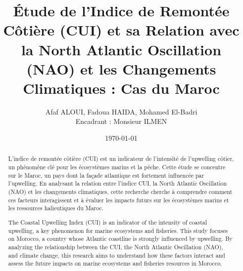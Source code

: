 \documentclass[a4paper,12pt]{article}
\title{Étude de l'Indice de Remontée Côtière (CUI) et sa Relation avec la North Atlantic Oscillation (NAO) et les Changements Climatiques : Cas du Maroc}
\author{Afaf ALOUI, Fadoua HAIDA, Mohamed El-Badri \\ Encadrant : Monsieur ILMEN}
\date{\today}
\begin{document}
\maketitle


\newpage
\vspace*{3cm}
\begin{abstract}
L'indice de remontée côtière (CUI) est un indicateur de l'intensité de l'upwelling côtier, un phénomène clé pour les écosystèmes marins et la pêche. Cette étude se concentre sur le Maroc, un pays dont la façade atlantique est fortement influencée par l'upwelling. En analysant la relation entre l'indice CUI, la North Atlantic Oscillation (NAO) et les changements climatiques, cette recherche cherche à comprendre comment ces facteurs interagissent et à évaluer les impacts futurs sur les écosystèmes marins et les ressources halieutiques du Maroc.
\end{abstract}

\newpage
\vspace*{3cm}
\renewcommand{\abstractname}{Abstract}
\begin{abstract}

The Coastal Upwelling Index (CUI) is an indicator of the intensity of coastal upwelling, a key phenomenon for marine ecosystems and fisheries. This study focuses on Morocco, a country whose Atlantic coastline is strongly influenced by upwelling. By analyzing the relationship between the CUI, the North Atlantic Oscillation (NAO), and climate change, this research aims to understand how these factors interact and assess the future impacts on marine ecosystems and fisheries resources in Morocco.
\end{abstract}
\newpage






\newpage

\listoffigures
\newpage
\end{document}
